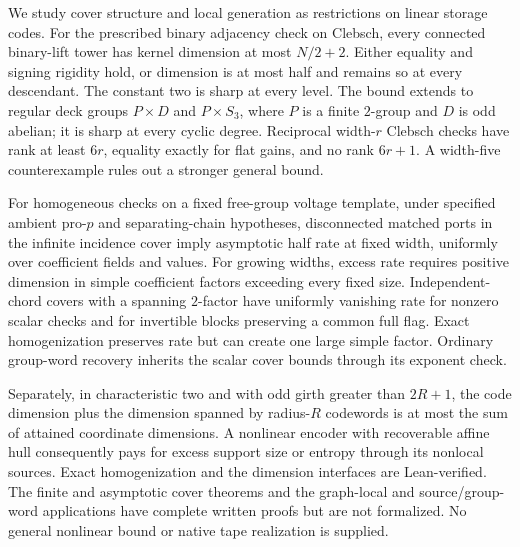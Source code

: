 We study cover structure and local generation as restrictions on linear
storage codes. For the prescribed binary adjacency check on Clebsch,
every connected binary-lift tower has kernel dimension at most $N/2+2$.
Either equality and signing rigidity hold, or dimension is at most half
and remains so at every descendant. The constant two is sharp at every
level. The bound extends to regular deck groups $P\times D$ and
$P\times S_3$, where $P$ is a finite $2$-group and $D$ is odd abelian;
it is sharp at every cyclic degree. Reciprocal width-$r$ Clebsch checks
have rank at least $6r$, equality exactly for flat gains, and no rank
$6r+1$. A width-five counterexample rules out a stronger general bound.

For homogeneous checks on a fixed free-group voltage template, under
specified ambient pro-$p$ and separating-chain hypotheses, disconnected
matched ports in the infinite incidence cover imply asymptotic half
rate at fixed width, uniformly over coefficient fields and values.
For growing widths, excess rate requires positive dimension in simple
coefficient factors exceeding every fixed size. Independent-chord
covers with a spanning $2$-factor have uniformly vanishing rate for
nonzero scalar checks and for invertible blocks preserving a common
full flag. Exact homogenization preserves rate but can create one
large simple factor. Ordinary group-word recovery inherits the scalar
cover bounds through its exponent check.

Separately, in characteristic two and with odd girth greater than
$2R+1$, the code dimension plus the dimension spanned by radius-$R$
codewords is at most the sum of attained coordinate dimensions.
A nonlinear encoder with recoverable affine hull consequently pays
for excess support size or entropy through its nonlocal sources.
Exact homogenization and the dimension interfaces are Lean-verified.
The finite and asymptotic cover theorems and the graph-local and
source/group-word applications have complete written proofs but are
not formalized. No general nonlinear bound or native tape realization
is supplied.

